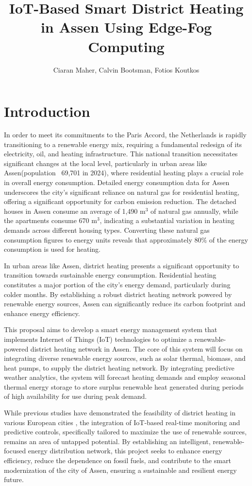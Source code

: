 \documentclass[conference]{IEEEtran}
\title{IoT-Based Smart District Heating in Assen Using Edge-Fog Computing}
\author{Ciaran Maher, Calvin Bootsman, Fotios Koutkos}
\begin{document}
\maketitle
\section{Introduction}
In order to meet its commitments to the Paris Accord, the Netherlands is rapidly transitioning to a renewable energy mix, requiring a fundamental redesign of its electricity, oil, and heating infrastructure\cite{paris_agreement}. This national transition necessitates significant changes at the local level, particularly in urban areas like Assen(population ~69,701 in 2024\cite{allecijfers}), where residential heating plays a crucial role in overall energy consumption. Detailed energy consumption data for Assen underscores the city's significant reliance on natural gas for residential heating, offering a significant opportunity for carbon emission reduction. The detached houses in Assen consume an average of 1,490 m$^3$ of natural gas annually, while the apartments consume 670 m$^3$\cite{assen_woningen}, indicating a substantial variation in heating demands across different housing types. Converting these natural gas consumption figures to energy units reveals that approximately 80\% of the energy consumption is used for heating.

In urban areas like Assen, district heating presents a significant opportunity to transition towards sustainable energy consumption. Residential heating constitutes a major portion of the city's energy demand, particularly during colder months. By establishing a robust district heating network powered by renewable energy sources, Assen can significantly reduce its carbon footprint and enhance energy efficiency\cite{allecijfers}.

This proposal aims to develop a smart energy management system that implements Internet of Things (IoT) technologies to optimize a renewable-powered district heating network in Assen. The core of this system will focus on integrating diverse renewable energy sources, such as solar thermal, biomass, and heat pumps, to supply the district heating network. By integrating predictive weather analytics, the system will forecast heating demands and employ seasonal thermal energy storage to store surplus renewable heat generated during periods of high availability for use during peak demand.

While previous studies have demonstrated the feasibility of district heating in various European cities \cite{kalundborg}, the integration of IoT-based real-time monitoring and predictive controls, specifically tailored to maximize the use of renewable sources, remains an area of untapped potential. By establishing an intelligent, renewable-focused energy distribution network, this project seeks to enhance energy efficiency, reduce the dependence on fossil fuels, and contribute to the smart modernization of the city of Assen, ensuring a sustainable and resilient energy future.
\end{document}

